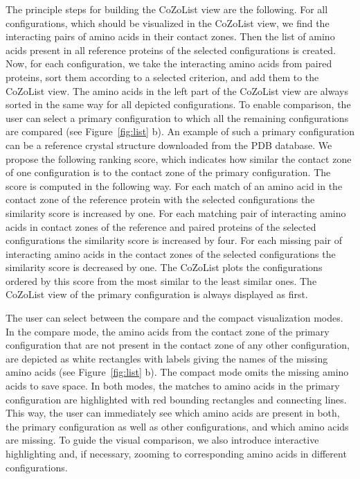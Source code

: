 \documentclass{bmcart}
\begin{document}
The principle steps for building the CoZoList view are the following.
For all configurations, which should be visualized in the CoZoList view, we find the interacting pairs of amino acids in their contact zones.
Then the list of amino acids present in all reference proteins of the selected configurations is created.
Now, for each configuration, we take the interacting amino acids from paired proteins, sort them according to a selected criterion, and add them to the CoZoList view.
The amino acids in the left part of the CoZoList view are always sorted in the same way for all depicted configurations.
To enable comparison, the user can select a primary configuration to which all the remaining configurations are compared (see Figure~\ref{fig:list} b).
An example of such a primary configuration can be a reference crystal structure downloaded from the PDB database.
We propose the following ranking score, which indicates how similar the contact zone of one configuration is to the contact zone of the primary configuration.
The score is computed in the following way.
For each match of an amino acid in the contact zone of the reference protein with the selected configurations the similarity score is increased by one.
For each matching pair of interacting amino acids in contact zones of the reference and paired proteins of the selected configurations the similarity score is increased by four.
For each missing pair of interacting amino acids in the contact zones of the selected configurations the similarity score is decreased by one.
The CoZoList plots the configurations ordered by this score from the most similar to the least similar ones.
The CoZoList view of the primary configuration is always displayed as first.

The user can select between the compare and the compact visualization modes.
In the compare mode, the amino acids from the contact zone of the primary configuration that are not present in the contact zone of any other configuration, are depicted as white rectangles with labels giving the names of the missing amino acids (see Figure~\ref{fig:list} b).
The compact mode omits the missing amino acids to save space.
In both modes, the matches to amino acids in the primary configuration are highlighted with red bounding rectangles and connecting lines.
This way, the user can immediately see which amino acids are present in both, the primary configuration as well as other configurations, and which amino acids are missing.
To guide the visual comparison, we also introduce interactive highlighting and, if necessary, zooming to corresponding amino acids in different configurations.
\end{document}
